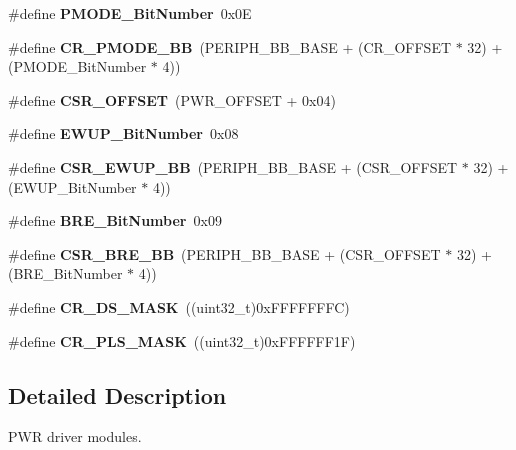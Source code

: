 \begin{DoxyCompactItemize}
\item 
\hypertarget{group___p_w_r_ga15fea9df1b0d324394336f70b319b377}{\#define {\bfseries P\-M\-O\-D\-E\-\_\-\-Bit\-Number}~0x0\-E}\label{group___p_w_r_ga15fea9df1b0d324394336f70b319b377}

\item 
\hypertarget{group___p_w_r_ga2e7c040f5c63f0fce3e274d9a03f1d1a}{\#define {\bfseries C\-R\-\_\-\-P\-M\-O\-D\-E\-\_\-\-B\-B}~(P\-E\-R\-I\-P\-H\-\_\-\-B\-B\-\_\-\-B\-A\-S\-E + (C\-R\-\_\-\-O\-F\-F\-S\-E\-T $\ast$ 32) + (P\-M\-O\-D\-E\-\_\-\-Bit\-Number $\ast$ 4))}\label{group___p_w_r_ga2e7c040f5c63f0fce3e274d9a03f1d1a}

\item 
\hypertarget{group___p_w_r_ga984cbe73312b6d3d355c5053763d499a}{\#define {\bfseries C\-S\-R\-\_\-\-O\-F\-F\-S\-E\-T}~(P\-W\-R\-\_\-\-O\-F\-F\-S\-E\-T + 0x04)}\label{group___p_w_r_ga984cbe73312b6d3d355c5053763d499a}

\item 
\hypertarget{group___p_w_r_ga94fe0520e8f9b71fa2b99c0565ec70ea}{\#define {\bfseries E\-W\-U\-P\-\_\-\-Bit\-Number}~0x08}\label{group___p_w_r_ga94fe0520e8f9b71fa2b99c0565ec70ea}

\item 
\hypertarget{group___p_w_r_gaaff864595f697850b19173b0bca991b0}{\#define {\bfseries C\-S\-R\-\_\-\-E\-W\-U\-P\-\_\-\-B\-B}~(P\-E\-R\-I\-P\-H\-\_\-\-B\-B\-\_\-\-B\-A\-S\-E + (C\-S\-R\-\_\-\-O\-F\-F\-S\-E\-T $\ast$ 32) + (E\-W\-U\-P\-\_\-\-Bit\-Number $\ast$ 4))}\label{group___p_w_r_gaaff864595f697850b19173b0bca991b0}

\item 
\hypertarget{group___p_w_r_ga1a0832bfe421cdd6f2640ffb625cc2d8}{\#define {\bfseries B\-R\-E\-\_\-\-Bit\-Number}~0x09}\label{group___p_w_r_ga1a0832bfe421cdd6f2640ffb625cc2d8}

\item 
\hypertarget{group___p_w_r_ga1451a5ec810860a7c2e28c23f0c0e928}{\#define {\bfseries C\-S\-R\-\_\-\-B\-R\-E\-\_\-\-B\-B}~(P\-E\-R\-I\-P\-H\-\_\-\-B\-B\-\_\-\-B\-A\-S\-E + (C\-S\-R\-\_\-\-O\-F\-F\-S\-E\-T $\ast$ 32) + (B\-R\-E\-\_\-\-Bit\-Number $\ast$ 4))}\label{group___p_w_r_ga1451a5ec810860a7c2e28c23f0c0e928}

\item 
\hypertarget{group___p_w_r_ga8ee6bf9218f3c476629dd9ee70deef21}{\#define {\bfseries C\-R\-\_\-\-D\-S\-\_\-\-M\-A\-S\-K}~((uint32\-\_\-t)0x\-F\-F\-F\-F\-F\-F\-F\-C)}\label{group___p_w_r_ga8ee6bf9218f3c476629dd9ee70deef21}

\item 
\hypertarget{group___p_w_r_gac4a30eebdd1d292331a578b189962e77}{\#define {\bfseries C\-R\-\_\-\-P\-L\-S\-\_\-\-M\-A\-S\-K}~((uint32\-\_\-t)0x\-F\-F\-F\-F\-F\-F1\-F)}\label{group___p_w_r_gac4a30eebdd1d292331a578b189962e77}

\end{DoxyCompactItemize}


\subsection{Detailed Description}
P\-W\-R driver modules. 